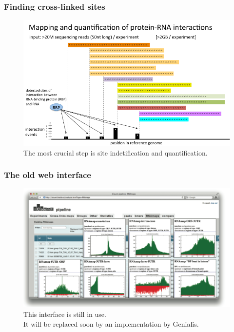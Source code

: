 \documentclass{beamer}
\begin{document}
\begin{frame}
\frametitle{Finding cross-linked sites}

\begin{figure}
\begin{center}
    \includegraphics[width=0.85\linewidth]{images/mapping.png}
    \caption{The most crucial step is site indetification and quantification.}
\end{center}
\end{figure}

\end{frame}


\begin{frame}
\frametitle{The old web interface}

\begin{figure}
\begin{center}
    \centering
    \includegraphics[width=0.85\linewidth]{images/old_webinterface.png}
    \caption{This interface is still in use.\\
    It will be replaced soon by an implementation by Genialis.}
\end{center}
\end{figure}

\end{frame}
\end{document}
